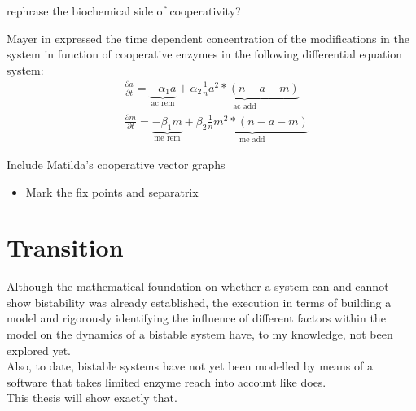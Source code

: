            \begin{itemize}
                {
                    \color{red}
                    \item rephrase the biochemical side of cooperativity?
                }
            \end{itemize}
            Mayer in \cite{mayer2020langevin} expressed the time dependent concentration of the modifications in the system in function of cooperative enzymes in the following differential equation system:
            \begin{subequations}
                \begin{align}
                    &\frac{\partial a}{\partial t} = \underbrace{- \alpha_1 a }_{\textrm{ac rem}} + \underbrace{ \alpha_2 \frac{1}{n} a^2*(n-a-m) }_{\textrm{ac add}}\\
                    &\frac{\partial m}{\partial t} = \underbrace{- \beta_1 m }_{\textrm{me rem}} + \underbrace{ \beta_2 \frac{1}{n} m^2*(n-a-m) }_{\textrm{me add}}
                \end{align}
                \label{eqn:cooperative}
            \end{subequations}
        \begin{itemize}
            {
                \color{red}
                \item Include Matilda's cooperative vector graphs
                    \begin{itemize}
                        \item Mark the fix points and separatrix
                    \end{itemize}
            }
        \end{itemize}
    \section{Transition}
        Although the mathematical foundation on whether a system can and cannot show bistability was already established, the execution in terms of building a model and rigorously identifying the influence of different factors within the model on the dynamics of a bistable system have, to my knowledge, not been explored yet.\\
        Also, to date, bistable systems have not yet been modelled by means of a software that takes limited enzyme reach into account like \ed does.\\ %
        This thesis will show exactly that. %
%
%
